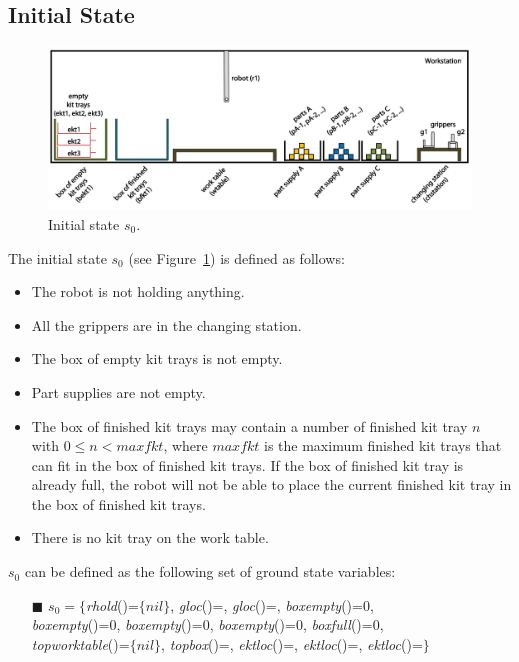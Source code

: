 

\subsection{Initial State}

\begin{figure}[h]
\centering
\includegraphics[width=12cm]{Figure/s_initial.jpg}
\caption{Initial state $s_0$.}
\label{fig:initial_state}
\end{figure}

The initial state $s_0$ (see Figure~\ref{fig:initial_state}) is defined as follows:

\begin{itemize}
\item The robot is not holding anything.
\item All the grippers are in the changing station.
\item The box of empty kit trays is not empty.
\item Part supplies are not empty.
\item The box of finished kit trays may contain a number of finished kit tray $n$ with $0\leq n < maxfkt$, where $maxfkt$ is the maximum finished kit trays that can fit in the box of finished kit trays. If the box of finished kit tray is already full, the robot will not be able to place the current finished kit tray in the box of finished kit trays.
\item There is no kit tray on the work table.
\end{itemize}


$s_0$ can be defined as the following set of ground state variables:
\begin{itemize}
 \item[{\color{RubineRed}$\blacksquare$}] $s_0 = \lbrace$\textit{rhold}()=$\lbrace nil\rbrace$, \textit{gloc}()=\chstation, \textit{gloc}()=\chstation, \textit{boxempty}()=0,\\ \textit{boxempty}()=0, \textit{boxempty}()=0, \textit{boxempty}()=0, \textit{boxfull}()=0,\\ \textit{topworktable}(\wtable)=$\lbrace nil\rbrace$, \textit{topbox}()=, \textit{ektloc}()=, \textit{ektloc}()=, \textit{ektloc}()=$\rbrace$
\end{itemize}


